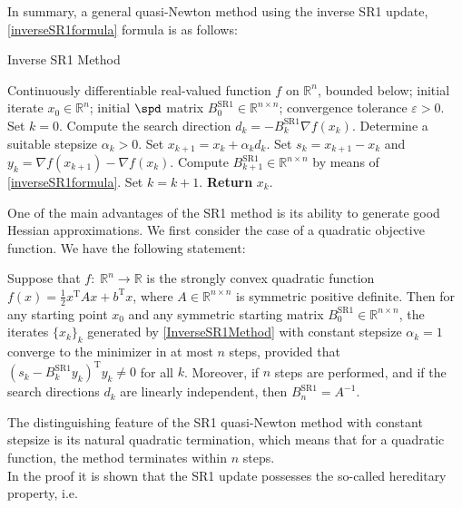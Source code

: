 In summary, a general quasi-Newton method using the inverse SR1 update, \cref{inverseSR1formula} formula is as follows:
\begin{algorithm}[H]
    \caption{Inverse SR1 Method}\label{InverseSR1Method}
    \begin{algorithmic}[1]
        \State Continuously differentiable real-valued function $f$ on $\mathbb{R}^n$, bounded below; initial iterate $x_0 \in \mathbb{R}^n$; initial $\spd$ matrix $B^{\mathrm{SR1}}_0 \in \mathbb{R}^{n \times n}$; convergence tolerance $\varepsilon > 0$. Set $k = 0$.
            \State Compute the search direction $d_k = - B^{\mathrm{SR1}}_k \nabla f(x_k)$.
            \State Determine a suitable stepsize $\alpha_k > 0$.
            \State Set $x_{k+1} = x_k + \alpha_k d_k$.
            \State Set $s_k = x_{k+1} - x_k$ and $y_k = \nabla f(x_{k+1}) - \nabla f(x_k)$.
            \State Compute $B^{\mathrm{SR1}}_{k+1} \in \mathbb{R}^{n \times n}$ by means of \cref{inverseSR1formula}. 
            \State Set $k = k+1$.
        \EndWhile
        \State \textbf{Return} $x_k$.
    \end{algorithmic}
\end{algorithm}
One of the main advantages of the SR1 method is its ability to generate good Hessian approximations. We first consider the case of a quadratic objective function. We have the following statement:
\begin{theorem}
    Suppose that $f \colon \; \mathbb{R}^n \to \mathbb{R}$ is the strongly convex quadratic function $f(x) = \frac{1}{2} x^{\mathrm{T}} A x + b^{\mathrm{T}} x$, where $A \in \mathbb{R}^{n \times n}$ is symmetric positive definite. Then for any starting point $x_0$ and any symmetric starting matrix $B^{\mathrm{SR1}}_0 \in \mathbb{R}^{n \times n}$, the iterates $\{x_k\}_k$ generated by \cref{InverseSR1Method} with constant stepsize $\alpha_k = 1$ converge to the minimizer in at most $n$ steps, provided that $(s_k - B^\mathrm{SR1}_k y_k)^{\mathrm{T}} y_k \neq 0$ for all $k$. Moreover, if $n$ steps are performed, and if the search directions $d_k$ are linearly independent, then $B^{\mathrm{SR1}}_n = A^{−1}$.
\end{theorem}
The distinguishing feature of the SR1 quasi-Newton method with constant stepsize is its natural quadratic termination, which means that for a quadratic function, the method terminates within $n$ steps. \\
In the proof it is shown that the SR1 update possesses the so-called hereditary property, i.e. 
